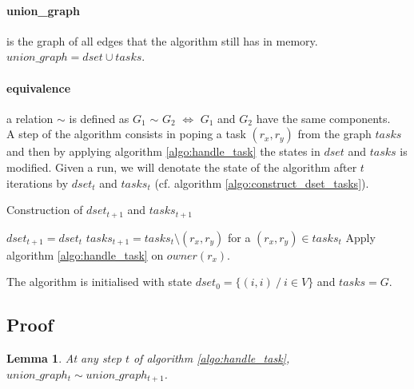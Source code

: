\documentclass[12px]{article}
\newtheorem{lemma}[theorem]{Lemma}
\begin{document}
    \paragraph{union\_graph} is the graph of all edges that the algorithm still has in memory. $union\_graph = dset \cup tasks$.

    \paragraph{equivalence} a relation $\sim$ is defined as $G_1$ $\sim$ $G_2$ $\Leftrightarrow$ $G_1$ and $G_2$ have the same components. \\

    A step of the algorithm consists in poping a task $(r_x, r_y)$ from the graph $tasks$ and then by applying algorithm \ref{algo:handle_task} the states in $dset$ and $tasks$ is modified.
    Given a run, we will denotate the state of the algorithm after $t$ iterations by $dset_t$ and $tasks_t$ (cf. algorithm \ref{algo:construct_dset_tasks}).

    \begin{algorithm}
      \caption{Construction of $dset_{t+1}$ and $tasks_{t+1}$}
      \begin{algorithmic}[1]
        \State $dset_{t+1} = dset_t$
        \State $tasks_{t+1} = tasks_t \setminus (r_x, r_y)$ for a $(r_x, r_y) \in tasks_t$
        \State Apply algorithm \ref{algo:handle_task} on $owner(r_x)$.
      \end{algorithmic}
      \label{algo:construct_dset_tasks}
    \end{algorithm}

    The algorithm is initialised with state $dset_0 = \{(i, i)~/~i \in V\}$ and $tasks = G$.

  \subsection{Proof}
    \begin{lemma}
      \label{lemma:transitivity}
      At any step $t$ of algorithm \ref{algo:handle_task}, $union\_graph_t \sim union\_graph_{t+1}$.
    \end{lemma}
\end{document}
